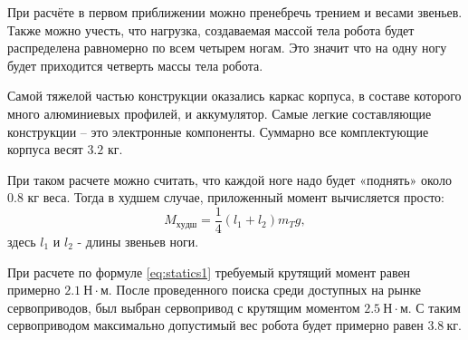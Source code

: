 При расчёте в первом приближении можно пренебречь трением и весами звеньев. Также можно учесть, что нагрузка, создаваемая массой тела робота будет распределена равномерно по всем четырем ногам. Это значит что на одну ногу будет приходится четверть массы тела робота.

Самой тяжелой частью конструкции оказались каркас корпуса, в составе которого много алюминиевых профилей, и аккумулятор. Самые легкие составляющие конструкции -- это электронные компоненты. Суммарно все комплектующие корпуса весят $3.2$ кг. 

При таком расчете можно считать, что каждой ноге надо будет «поднять» около $ 0.8 $ кг веса. Тогда в худшем случае, приложенный момент вычисляется просто:
\begin{equation} \label{eq:statics1}
    M_{худш}= \frac 1 4 (l_{1}+l_{2}) m_T g, 
\end{equation}
\noindent здесь $l_1$ и $l_2$ - длины звеньев ноги.

При расчете по формуле \ref{eq:statics1} требуемый крутящий момент равен примерно $ 2.1  \: Н \cdot м$. После проведенного поиска среди доступных на рынке сервоприводов, был выбран сервопривод с крутящим моментом $ 2.5 \: Н \cdot м $. С таким сервоприводом максимально допустимый вес робота будет примерно равен $ 3.8 \: кг $.
